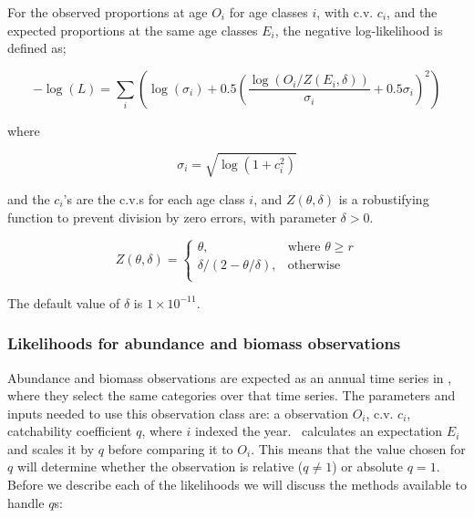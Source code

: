 For the observed proportions at age $O_i$ for age classes $i$, with c.v. $c_i$, and the expected proportions at the same age classes $E_i$, the negative log-likelihood is defined as;

\begin{equation}
- \log \left(L \right) = \sum\limits_i \left( \log \left( \sigma _i \right) + 0.5\left( \frac{\log \left(O_i / Z \left(E_i,\delta \right) \right)}{\sigma_i} + 0.5 \sigma_i \right)^2 \right)
\end{equation}

where

\begin{equation}
\sigma_i  = \sqrt{\log \left(1+c_i^2 \right)}
\end{equation}

and the $c_i$'s are the c.v.s for each age class $i$, and $Z \left(\theta,\delta \right)$ is a robustifying function to prevent division by zero errors, with parameter $\delta>0$.

\begin{equation}
Z \left(\theta,\delta \right) = \begin{cases}
\theta, & \text{where $\theta \ge r$} \\
\delta/\left( 2-\theta/\delta \right), & \text{otherwise} \\
\end{cases}
\end{equation}

The default value of $\delta$ is $1 \times 10^{-11}$.


\subsubsection{Likelihoods for abundance and biomass observations}\label{Obs:biomass}

Abundance and biomass observations are expected as an annual time series in \CNAME, where they select the same categories over that time series. The parameters and inputs needed to use this observation class are: a observation $O_i$, c.v. $c_i$, catchability coefficient $q$, where $i$ indexed the year. \CNAME\ calculates an expectation $E_i$ and scales it by $q$ before comparing it to $O_i$. This means that the value chosen for $q$ will determine whether the observation is relative ($q\neq 1$) or absolute $q = 1$. Before we describe each of the likelihoods we will discuss the methods available to handle $q$s:

